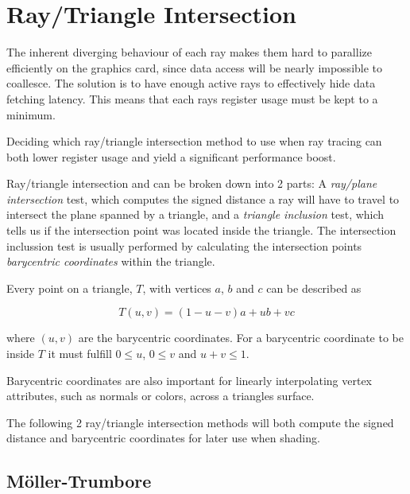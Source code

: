 \section{Ray/Triangle Intersection}

The inherent diverging behaviour of each ray makes them hard to
parallize efficiently on the graphics card, since data access will be
nearly impossible to coallesce. The solution is to have enough active
rays to effectively hide data fetching latency. This means that each
rays register usage must be kept to a minimum.

Deciding which ray/triangle intersection method to use when ray
tracing can both lower register usage and yield a significant
performance boost.


Ray/triangle intersection and can be broken down into 2 parts: A
\textit{ray/plane intersection} test, which computes the signed
distance a ray will have to travel to intersect the plane spanned by a
triangle, and a \textit{triangle inclusion} test, which tells us if
the intersection point was located inside the triangle. The
intersection inclussion test is usually performed by calculating the
intersection points \textit{barycentric coordinates} within the
triangle.

Every point on a triangle, $T$, with vertices $a$, $b$ and $c$ can be
described as 

\begin{displaymath}
  T(u,v) = (1-u-v)a + ub + vc
\end{displaymath}
 
where $(u, v)$ are the barycentric coordinates. For a barycentric
coordinate to be inside $T$ it must fulfill $0 \le u$, $0 \le v$ and
$u+v \le 1$.

Barycentric coordinates are also important for linearly interpolating
vertex attributes, such as normals or colors, across a triangles
surface.

The following 2 ray/triangle intersection methods will both compute
the signed distance and barycentric coordinates for later use when
shading.

\subsection{Möller-Trumbore}

